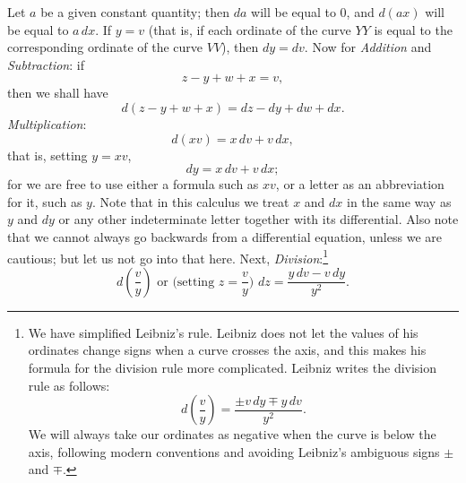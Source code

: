 \documentclass[twoside,openright]{article}
\begin{document}
Let $a$ be a given constant quantity; then $da$ will be equal to 0,
and $d(ax)$ will be equal to $a\,dx$. If $y = v$ (that is, if each ordinate of the
curve $YY$ is equal to the corresponding ordinate of the curve $VV$),
then $dy = dv$.  \newline Now for {\em Addition} and {\em
  Subtraction}: if
$$z-y+w+x = v,$$ then we shall have $$d(z-y+w+x) = dz-dy +dw + dx.$$ \newline
{\em Multiplication}:
$$d(xv) = x\,dv + v\,dx,$$ that is, setting $y = xv$,
$$dy = x\,dv + v\,dx;$$ for we are free to use either
a formula such as $xv$, or a letter as an abbreviation for it, such as
$y$. Note that in this calculus we treat $x$ and $dx$ in the same way
as $y$ and $dy$ or any other indeterminate letter together with its
differential.  Also note that we cannot always go backwards from a
differential equation, unless we are cautious; but let us not go into
that here. \newline Next, {\em Division}:\footnote{We have simplified
  Leibniz's rule.  Leibniz does not let the values of his ordinates
  change signs when a curve crosses the axis, and this makes his
  formula for the division rule more complicated.  Leibniz writes the
  division rule as follows:
$$d\left(\frac{v}{y}\right) = 
\frac{\pm v\,dy \mp y\,dv}{y^2}.$$ We will always take our ordinates
as negative when the curve is below the axis, following modern
conventions and avoiding Leibniz's ambiguous signs $\pm$ and $\mp$.}
$$d\left(\frac{v}{y}\right) \mbox{ or (setting $z = \frac{v}{y}$) }dz =
\frac{y\,dv - v\,dy }{y^2}.$$
\end{document}
